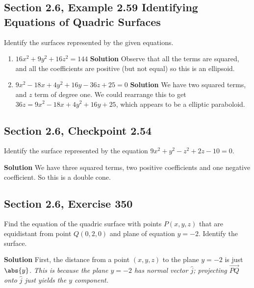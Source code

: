 \documentclass[]{mangos-musings}
\begin{document}
\subsection{Section 2.6, Example 2.59 Identifying Equations of Quadric Surfaces}
Identify the surfaces represented by the given equations.
\begin{enumerate}[label=(\alph*)]
  \item $16x^2 + 9y^2 + 16z^2 = 144$
  \textbf{Solution}
  Observe that all the terms are squared, and all the coefficients are positive (but not equal) so this is an ellipsoid.
  \item $9x^2 - 18x + 4y^2 + 16y - 36z + 25 = 0$
  \textbf{Solution}
  We have two squared terms, and $z$ term of degree one. We could rearrange this to get $36z = 9x^2 - 18x + 4y^2 + 16y + 25$, which appears to be a elliptic paraboloid.
\end{enumerate}

\subsection{Section 2.6, Checkpoint 2.54}
Identify the surface represented by the equation $9x^2 + y^2 - z^2 + 2z - 10 = 0$.

\textbf{Solution} We have three squared terms, two positive coefficients and one negative coefficient. So this is a double cone.

\subsection{Section 2.6, Exercise 350}
Find the equation of the quadric surface with points $P(x,y,z)$ that are equidistant from point $Q(0,2,0)$ and plane of equation $y=-2$. Identify the surface. 

\textbf{Solution} First, the distance from a point $(x, y, z)$ to the plane $y = -2$ is just $\abs{y}$. \textit{This is because the plane $y = -2$ has normal vector $\hat{j}$; projecting $\overrightarrow{PQ}$ onto $\hat{j}$ just yields the $y$ component.}
\end{document}
